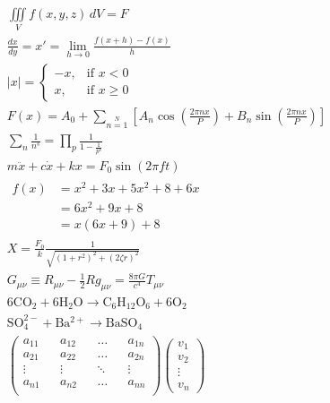 \documentclass{article}
\begin{document}
    \begin{gather*}
        \iiint \limits_V f(x,y,z)\, dV = F\\
        \frac{dx}{dy} = x' = \lim_{h \to 0}\frac{f\left(x+h\right)-f\left(x\right)}{h}\\ 
        |x| =
        \begin{cases}
            -x,& \text{if }x < 0\\
            x,& \text{if }x\geq 0
        \end{cases}\\
        F(x) = A_0 + \sum\limits_{n=1}\limits^N \left[A_n \cos\left(\frac{2\pi nx}{P}\right) + B_n \sin\left(\frac{2\pi nx}{P}\right)\right]\\
        \sum \limits_n \frac{1}{n^s} = \prod \limits_p \frac{1}{1 - \frac{1}{p^s}}\\
        m\ddot{x} + c\dot{x} + kx = F_0 \sin(2\pi ft)\\
        \begin{split}
            f(x) &= x^2 + 3x + 5x^2 + 8 + 6x\\
            &= 6x^2 + 9x + 8\\
            &= x(6x+9) + 8
        \end{split}\\
        X = \frac{F_0}{k} \frac{1}{\sqrt{(1+r^2)^2 + (2\zeta r)^2}}\\
        G_{\mu\nu} \equiv R_{\mu\nu} - \frac{1}{2}Rg_{\mu\nu} = \frac{8\pi G}{c^4}T_{\mu\nu}\\
        \mathrm{6CO_2 + 6H_2O \rightarrow C_6H_{12}O_6 + 6O_2}\\
        \mathrm{SO^{2-}_4 + Ba^{2+} \rightarrow BaSO_4}\\
        \begin{pmatrix}
            a_{11}&&a_{12}&&\dots&&a_{1n}\\
            a_{21}&&a_{22}&&\dots&&a_{2n}\\
            \vdots&&\vdots&&\ddots&&\vdots\\
            a_{n1}&&a_{n2}&&\dots&&a_{nn}\\
        \end{pmatrix}
        \begin{pmatrix}
            v_1\\v_2\\\vdots\\v_n

\end{pmatrix}
\end{gather*}
\end{document}
